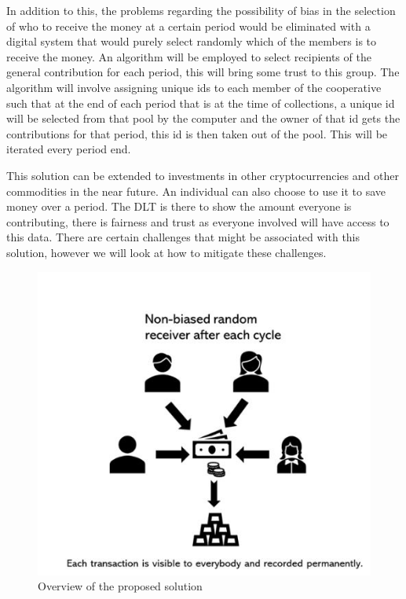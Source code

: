 \documentclass{article}
\begin{document}
\begin{flushleft}
In addition to this, the problems regarding the possibility of bias in the selection of who to receive the money at a certain period would be eliminated with a digital system that would purely select randomly which of the members is to receive the money. An algorithm will be employed to select recipients of the general contribution for each period, this will bring some trust to this group. The algorithm will involve assigning unique ids to each member of the cooperative such that at the end of each period that is at the time of collections, a unique id will be selected from that pool by the computer and the owner of that id gets the contributions for that period, this id is then taken out of the pool. This will be iterated every period end.

This solution can be extended to investments in other cryptocurrencies and other commodities in the near future. An individual can also choose to use it to save money over a period. The DLT is there to show the amount everyone is contributing, there is fairness and trust as everyone involved will have access to this data. There are certain challenges that might be associated with this solution, however we will look at how to mitigate these challenges.

\begin{figure}[H]
\centering
\includegraphics[scale=1.0]{cop}
\caption{Overview of the proposed solution}
\label{fig:central}
\end{figure}


\end{flushleft}
\end{document}
